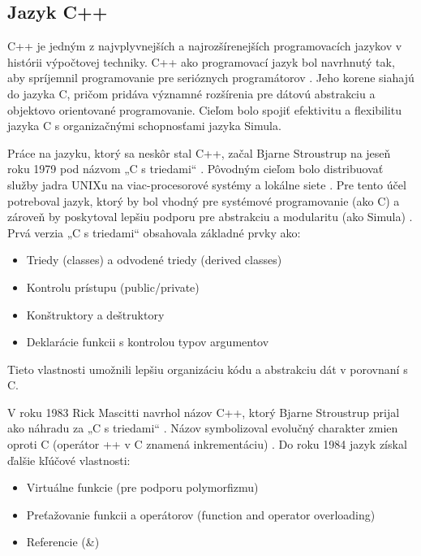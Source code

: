 \documentclass[11pt]{article}
\begin{document}
\subsection{Jazyk C++}

C++ je jedným z najvplyvnejších a najrozšírenejších programovacích jazykov v histórii výpočtovej techniky. C++ ako programovací jazyk bol navrhnutý tak, aby spríjemnil programovanie pre serióznych programátorov \cite{c++_stroustrup}. Jeho korene siahajú do jazyka C, pričom pridáva významné rozšírenia pre dátovú abstrakciu a objektovo orientované programovanie. Cieľom bolo spojiť efektivitu a flexibilitu jazyka C s organizačnými schopnosťami jazyka Simula.

Práce na jazyku, ktorý sa neskôr stal C++, začal Bjarne Stroustrup na jeseň roku 1979 pod názvom „C s triedami“ \cite{c++_stroustrup}. Pôvodným cieľom bolo distribuovať služby jadra UNIXu na viac-procesorové systémy a lokálne siete \cite{c++_stroustrup}. Pre tento účel potreboval jazyk, ktorý by bol vhodný pre systémové programovanie (ako C) a zároveň by poskytoval lepšiu podporu pre abstrakciu a modularitu (ako Simula) \cite{c++_stroustrup}. Prvá verzia „C s triedami“ obsahovala základné prvky ako:

\begin{itemize}
    \item Triedy (classes) a odvodené triedy (derived classes)
    \item Kontrolu prístupu (public/private)
    \item Konštruktory a deštruktory
    \item Deklarácie funkcii s kontrolou typov argumentov \cite{c++_stroustrup}
\end{itemize}

\noindent Tieto vlastnosti umožnili lepšiu organizáciu kódu a abstrakciu dát v porovnaní s C.

V roku 1983 Rick Mascitti navrhol názov C++, ktorý Bjarne Stroustrup prijal ako náhradu za „C s triedami“ \cite{c++_stroustrup}. Názov symbolizoval evolučný charakter zmien oproti C (operátor ++ v C znamená inkrementáciu) \cite{c++_stroustrup}. Do roku 1984 jazyk získal ďalšie kľúčové vlastnosti:

\begin{itemize}
    \item Virtuálne funkcie (pre podporu polymorfizmu) \cite{c++_stroustrup}
    \item Preťažovanie funkcii a operátorov (function and operator overloading) \cite{c++_stroustrup}
    \item Referencie (\&) \cite{c++_stroustrup}
\end{itemize}
\end{document}
